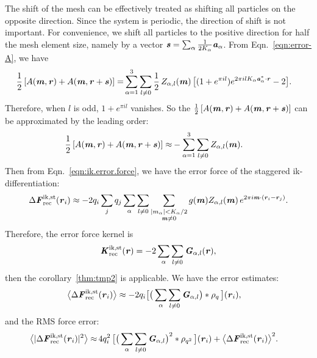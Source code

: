 \documentclass[aps,pre,preprint,unsortedaddress]{revtex4}
\renewcommand{\v}[1]{\textbf{\textit{#1}}}
\begin{document}
The shift of the mesh can be effectively treated as shifting all
particles on the opposite direction. Since the system is periodic,
the direction of shift is not important. For convenience, we shift
all particles to the positive direction for half the mesh element size, namely
by a vector $\v s = \sum_\alpha\frac1{2K_\alpha}\v a_\alpha$. From
Eqn.~\eqref{eqn:error-A}, we have
\begin{align}
  \frac12\, [A(\v m, \v r) + A(\v m, \v r+\v s)]
  =&
  \sum_{\alpha=1}^3\sum_{l\neq 0}
  \frac12\,
  Z_{\alpha,l}(\v m)\,
  \big[
  (1 + e^{\pi i l})e^{2\pi i l K_\alpha\v a^\ast_\alpha\cdot \v r} - 2
  \big].
\end{align}
Therefore, when $l$ is odd, $1 + e^{\pi i l}$ vanishes. So the $\frac12\,[A(\v
m, \v r) + A(\v m, \v r+\v s)]$ can be approximated by the leading
order:
\begin{align}
  \frac12\, [A(\v m, \v r) + A(\v m, \v r+\v s)]
  \approx&
  -\sum_{\alpha=1}^3\sum_{l\neq 0}
  Z_{\alpha,l}(\v m).
\end{align}
Then from Eqn.~\eqref{eqn:ik.error.force}, we have the error force of
the staggered ik-differentiation:
\begin{align}\label{eqn:ik-st-error-force}
  \Delta\v F^{\textrm{ik,st}}_{\textrm{rec}}(\v r_i)
  \approx -2q_i
  \sum_jq_j
  \sum_\alpha\sum_{l\neq 0}
  \sum_{
    \begin{subarray}{c}
      \vert m_{\alpha}\vert < K_\alpha/2\\
      \v m\neq 0
    \end{subarray}}
  g(\v m) Z_{\alpha,l}(\v m)\,e^{2\pi i\v m\cdot(\v r_i-\v r_j)}.
\end{align}
Therefore, the error force kernel is
\begin{align}
  \v K^{\textrm{ik,st}}_{\textrm{rec}}(\v r)
  = -2
  \sum_\alpha\sum_{l\neq 0}\v G_{\alpha,l}(\v r),
\end{align}
then the corollary~\ref{thm:tmp2} is applicable.
We have the error estimates:
\begin{align}\label{eqn:ik.st.meanf}
  \big\langle
  \Delta\v F_{\textrm{rec}}^{\textrm{ik,st}}(\v r_i)
  \big\rangle
  & \approx
  - 2 q_i
  \big[
  \big(
  \sum_{\alpha}\sum_{l\neq 0}\v G_{\alpha,l}
  \big)
  \ast\rho_q\,
  \big] (\v r_i),
\end{align}
and the RMS force error:
\begin{align}\label{eqn:ik.st.error}
  \big\langle
  \vert\Delta\v F_{\textrm{rec}}^{\textrm{ik,st}}(\v r_i)\vert^2
  \big\rangle
  \approx&\,
  4q_i^2\,
  \big[
  \big(
  \sum_{\alpha} \sum_{l\neq 0}  
  \v G_{\alpha,l}
  \big)^2
  \ast \rho_{q^2}\,
  \big] (\v r_i) +
  \big\langle
  \Delta\v F_{\textrm{rec}}^{\textrm{ik,st}}(\v r_i)
  \big\rangle^2.
\end{align}
\end{document}
